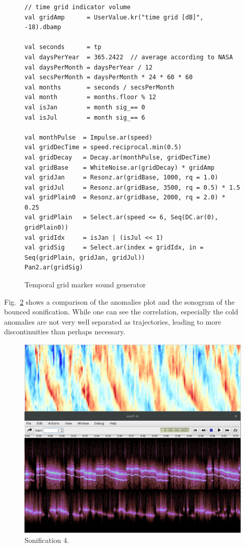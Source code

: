 \documentclass[11pt,a4paper]{article}
\newcommand{\figref}[1]{Fig.~\ref{#1}}
\begin{document}
\begin{figure}
\begin{lstlisting}[style=scala]
// time grid indicator volume
val gridAmp      = UserValue.kr("time grid [dB]", -18).dbamp

val seconds      = tp
val daysPerYear  = 365.2422  // average according to NASA
val daysPerMonth = daysPerYear / 12
val secsPerMonth = daysPerMonth * 24 * 60 * 60
val months       = seconds / secsPerMonth
val month        = months.floor % 12
val isJan        = month sig_== 0
val isJul        = month sig_== 6

val monthPulse  = Impulse.ar(speed)
val gridDecTime = speed.reciprocal.min(0.5)
val gridDecay   = Decay.ar(monthPulse, gridDecTime)
val gridBase    = WhiteNoise.ar(gridDecay) * gridAmp
val gridJan     = Resonz.ar(gridBase, 1000, rq = 1.0)
val gridJul     = Resonz.ar(gridBase, 3500, rq = 0.5) * 1.5
val gridPlain0  = Resonz.ar(gridBase, 2000, rq = 2.0) * 0.25
val gridPlain   = Select.ar(speed <= 6, Seq(DC.ar(0), gridPlain0))
val gridIdx     = isJan | (isJul << 1)
val gridSig     = Select.ar(index = gridIdx, in = Seq(gridPlain, gridJan, gridJul))
Pan2.ar(gridSig)
\end{lstlisting}
\caption{Temporal grid marker sound generator}
\label{fig:sonif4-grid-code}
\end{figure}

\figref{fig:sonif4-compare-with-plot} shows a comparison of the anomalies plot and the sonogram of the bounced sonification. While one can see the correlation, especially the cold anomalies are not very well separated as trajectories, leading to more discontinuities than perhaps necessary.

\begin{figure}
\includegraphics[width=\textwidth]{figures/sonif4-compare-with-plot.jpg}
\caption{Sonification 4. }
\label{fig:sonif4-compare-with-plot}
\end{figure}
\end{document}
